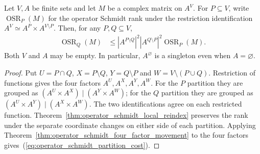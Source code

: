 \begin{theorem}
    \label{thm:operator_schmidt_partition_comparison}
    \leanok
    Let $V,A$ be finite sets and let $M$ be a complex matrix on $A^V$.
    For $P\subseteq V$, write $\operatorname{OSR}_P(M)$ for the operator
    Schmidt rank under the restriction identification
    $A^V\simeq A^P\times A^{V\setminus P}$.
    Then, for any $P,Q\subseteq V$,
    \begin{align}
        \operatorname{OSR}_Q(M)
         & \le |A^{P\setminus Q}|^2|A^{Q\setminus P}|^2
        \operatorname{OSR}_P(M).
        \label{eq:operator_schmidt_partition_cost}
    \end{align}
    Both $V$ and $A$ may be empty. In particular, $A^\varnothing$ is a
    singleton even when $A=\varnothing$.
\end{theorem}
\begin{proof}\leanok
    Put $U=P\cap Q$, $X=P\setminus Q$, $Y=Q\setminus P$ and
    $W=V\setminus(P\cup Q)$. Restriction of functions gives the four factors
    $A^U,A^X,A^Y,A^W$. For the $P$ partition they are grouped as
    $(A^U\times A^X)\mid(A^Y\times A^W)$; for the $Q$ partition they are
    grouped as $(A^U\times A^Y)\mid(A^X\times A^W)$.
    The two identifications agree on each restricted function.
    Theorem~\ref{thm:operator_schmidt_local_reindex} preserves the rank under
    the separate coordinate changes on either side of each partition.
    Applying Theorem~\ref{thm:operator_schmidt_four_factor_movement} to the
    four factors gives~(\ref{eq:operator_schmidt_partition_cost}).
\end{proof}

